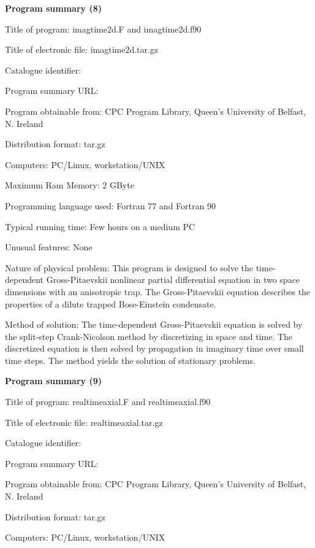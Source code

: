 \documentclass[onecolumn]{elsart3p}
\begin{document}
{\bf Program summary (8)}

Title of program: imagtime2d.F and imagtime2d.f90

Title of electronic file: imagtime2d.tar.gz


Catalogue identifier:

Program summary URL: 

Program obtainable from: CPC Program Library, Queen's University of 
Belfast, N. Ireland

Distribution format: tar.gz

Computers: PC/Linux, workstation/UNIX

Maximum Ram Memory: 2 GByte

Programming language used: Fortran 77 and Fortran 90




Typical running time: Few hours on a medium PC

Unusual features: None

Nature of physical problem: This program is designed to solve the
time-dependent Gross-Pitaevskii nonlinear partial differential equation
in two space dimensions with an anisotropic trap. The Gross-Pitaevskii
equation describes the properties of a dilute trapped Bose-Einstein
condensate.


Method of solution: The time-dependent Gross-Pitaevskii equation is 
solved by the split-step Crank-Nicolson method by discretizing in space 
and time. The discretized equation is then solved by propagation in 
imaginary time over small time steps.  The method yields the solution of 
stationary problems.  



{\bf Program summary (9)}

Title of program: realtimeaxial.F and realtimeaxial.f90

Title of electronic file: realtimeaxial.tar.gz


Catalogue identifier:

Program summary URL: 

Program obtainable from: CPC Program Library, Queen's University of 
Belfast, N. Ireland

Distribution format: tar.gz

Computers: PC/Linux, workstation/UNIX
\end{document}
